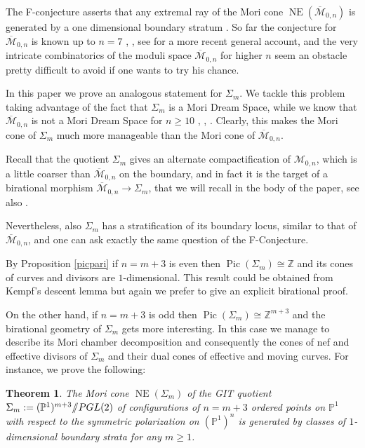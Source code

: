 \documentclass[a4paper,10pt]{amsart}
\newtheorem{theoremn}{Theorem}
\theoremstyle{definition}
\renewcommand{\P}{\mathbb{P}}
\newcommand{\cM}{\overline{\mathcal{M}}}
\DeclareMathOperator{\NE}{NE}
\DeclareMathOperator{\Pic}{Pic}
\newcommand{\quot}{/\hspace{-1.2mm}/}
\begin{document}
The F-conjecture asserts that any extremal ray of the Mori cone $\NE(\cM_{0,n})$ is generated by a one dimensional boundary stratum \cite[Conjecture 0.2]{GKM02}. So far the conjecture for $\cM_{0,n}$ is known up to $n=7$ \cite[Theorem 1.2 (3)]{KMc}, \cite{Lars}, see \cite{FGL16} for a more recent general account, and the very intricate combinatorics of the moduli space $\cM_{0,n}$ for higher $n$ seem an obstacle pretty difficult to avoid if one wants to try his chance.

In this paper we prove an analogous statement for $\Sigma_m$. We tackle this problem taking advantage of the fact that $\Sigma_m$ is a Mori Dream Space, while we know that $\cM_{0,n}$ is not a Mori Dream Space for $n\geq 10$ \cite[Corollary 1.4]{CT15}, \cite[Theorem 1.1]{GK16}, \cite[Addendum 1.4]{HKL16}. Clearly, this makes the Mori cone of $\Sigma_m$ much more manageable than the Mori cone of $\overline{\mathcal{M}}_{0,n}$. 

Recall that the quotient $\Sigma_m$ gives an alternate compactification of $\mathcal{M}_{0,n}$, which is a little coarser than $\cM_{0,n}$ on the boundary, and in fact it is the target of a birational morphism $\cM_{0,n} \to \Sigma_m$, that we will recall in the body of the paper, see also \cite{Bo11}. 

Nevertheless, also $\Sigma_m$ has a stratification of its boundary locus, similar to that of $\cM_{0,n}$, and one can ask exactly the same question of the F-Conjecture.

By Proposition \ref{picpari} if $n = m+3$ is even then $\Pic(\Sigma_m)\cong \mathbb{Z}$ and its cones of curves and divisors are $1$-dimensional. This result could be obtained from Kempf's descent lemma \cite[Theorem 2.3]{DN89} but again we prefer to give an explicit birational proof.
 
On the other hand, if $n = m+3$ is odd then $\Pic(\Sigma_m)\cong \mathbb{Z}^{m+3}$ and the birational geometry of $\Sigma_m$ gets more interesting. In this case we manage to describe its Mori chamber decomposition and consequently the cones of nef and effective divisors of $\Sigma_m$ and their dual cones of effective and moving curves. For instance, we prove the following:

\begin{theoremn}\label{inthm}
The Mori cone $\NE(\Sigma_m)$ of the GIT quotient $\Sigma_m : = (\mathbb{P}^1)^{m+3}\quot PGL(2)$ of configurations of $n = m+3$ ordered points on $\P^1$ with respect to the symmetric polarization on $(\mathbb{P}^1)^n$ is generated by classes of $1$-dimensional boundary strata for any $m\geq 1$.
\end{theoremn}
\end{document}
